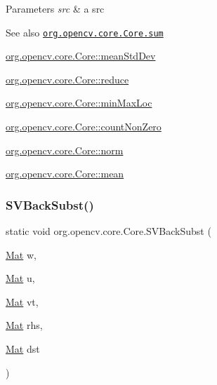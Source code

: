 \begin{DoxyParams}{Parameters}
{\em src} & a src\\
\hline
\end{DoxyParams}
\begin{DoxySeeAlso}{See also}
\href{http://docs.opencv.org/modules/core/doc/operations_on_arrays.html#sum}{\tt org.\+opencv.\+core.\+Core.\+sum} 

\mbox{\hyperlink{classorg_1_1opencv_1_1core_1_1_core_af8d7fbb33c11fbf6115d4c242dbbb5b3}{org.\+opencv.\+core.\+Core\+::mean\+Std\+Dev}} 

\mbox{\hyperlink{classorg_1_1opencv_1_1core_1_1_core_a1849fb31954ac7655a174184f2eba671}{org.\+opencv.\+core.\+Core\+::reduce}} 

\mbox{\hyperlink{classorg_1_1opencv_1_1core_1_1_core_a87987114238d2094a01395f12d6a9367}{org.\+opencv.\+core.\+Core\+::min\+Max\+Loc}} 

\mbox{\hyperlink{classorg_1_1opencv_1_1core_1_1_core_a216308f36e765f82c521087fe283e045}{org.\+opencv.\+core.\+Core\+::count\+Non\+Zero}} 

\mbox{\hyperlink{classorg_1_1opencv_1_1core_1_1_core_a282aac8c7806f10f75738bf8db3af7a8}{org.\+opencv.\+core.\+Core\+::norm}} 

\mbox{\hyperlink{classorg_1_1opencv_1_1core_1_1_core_aff700e66b1cef1a74cfd94d405369edf}{org.\+opencv.\+core.\+Core\+::mean}} 
\end{DoxySeeAlso}
\mbox{\label{classorg_1_1opencv_1_1core_1_1_core_a8f8ec69060789e7183c4a2a49dd729d9}} 
\subsubsection{\texorpdfstring{S\+V\+Back\+Subst()}{SVBackSubst()}}
{\footnotesize\ttfamily static void org.\+opencv.\+core.\+Core.\+S\+V\+Back\+Subst (\begin{DoxyParamCaption}\item[{\mbox{\hyperlink{classorg_1_1opencv_1_1core_1_1_mat}{Mat}}}]{w,  }\item[{\mbox{\hyperlink{classorg_1_1opencv_1_1core_1_1_mat}{Mat}}}]{u,  }\item[{\mbox{\hyperlink{classorg_1_1opencv_1_1core_1_1_mat}{Mat}}}]{vt,  }\item[{\mbox{\hyperlink{classorg_1_1opencv_1_1core_1_1_mat}{Mat}}}]{rhs,  }\item[{\mbox{\hyperlink{classorg_1_1opencv_1_1core_1_1_mat}{Mat}}}]{dst }\end{DoxyParamCaption})\hspace{0.3cm}{\ttfamily [static]}}

